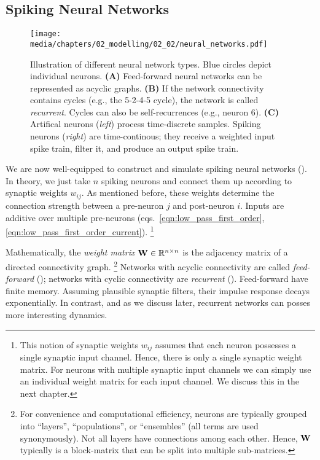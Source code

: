 \pagebreak

\subsection{Spiking Neural Networks}
\label{sec:neural_networks}

\begin{figure}
	\centering
	\texttt{[image: media/chapters/02\_modelling/02\_02/neural\_networks.pdf]}%
	{\label{fig:neural_networks_a}}%
	{\label{fig:neural_networks_b}}%
	{\label{fig:neural_networks_c}}%
	\caption[Illustration of different neural network types]{Illustration of different neural network types. Blue circles depict individual neurons. \textbf{(A)} Feed-forward neural networks can be represented as acyclic graphs. \textbf{(B)} If the network connectivity contains cycles (e.g., the 5-2-4-5 cycle), the network is called \emph{recurrent}. Cycles can also be self-recurrences (e.g., neuron 6). \textbf{(C)} Artifical neurons (\emph{left}) process time-discrete samples. Spiking neurons (\emph{right}) are time-continous; they receive a weighted input spike train, filter it, and produce an output spike train.}
\end{figure}


We are now well-equipped to construct and simulate spiking neural networks (\SNNpl).
In theory, we just take $n$ spiking neurons and connect them up according to synaptic weights $w_{ij}$. As mentioned before, these weights determine the connection strength between a pre-neuron $j$ and post-neuron $i$. Inputs are additive over multiple pre-neurons (eqs.~\ref{eqn:low_pass_first_order}, \ref{eqn:low_pass_first_order_current}).%
\footnote{This notion of synaptic weights $w_{ij}$ assumes that each neuron possesses a single synaptic input channel.
Hence, there is only a single synaptic weight matrix.
For neurons with multiple synaptic input channels we can simply use an individual weight matrix for each input channel. We discuss this in the next chapter.}

Mathematically, the \emph{weight matrix} $\mathbf{W} \in \mathbb{R}^{n \times n}$ is the adjacency matrix of a directed connectivity graph.%
\footnote{For convenience and computational efficiency, neurons are typically grouped into \enquote{layers}, \enquote{populations}, or \enquote{ensembles} (all terms are used synonymously).
Not all layers have connections among each other. Hence, $\mathbf{W}$ typically is a block-matrix that can be split into multiple sub-matrices.}
Networks with acyclic connectivity are called \emph{feed-forward} (); networks with cyclic connectivity are \emph{recurrent} ().
Feed-forward \SNNpl have finite memory.
Assuming plausible synaptic filters, their impulse response decays exponentially.
In contrast, and as we discuss later, recurrent networks can posses more interesting dynamics.

